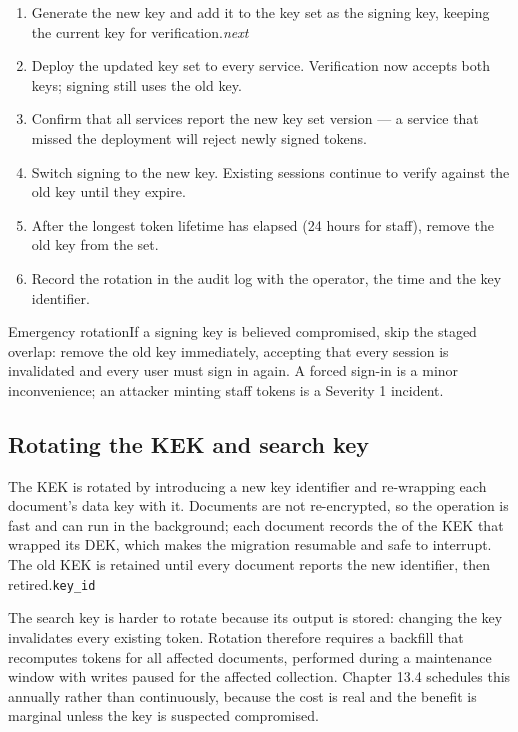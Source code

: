 \documentclass[11pt,a4paper,oneside]{book}
\begin{document}
\begin{enumerate}
\item Generate the new key and add it to the key set as the  signing key, keeping the current key for verification.\emph{next}
\item Deploy the updated key set to every service. Verification now accepts both keys; signing still uses the old key.
\item Confirm that all services report the new key set version — a service that missed the deployment will reject newly signed tokens.
\item Switch signing to the new key. Existing sessions continue to verify against the old key until they expire.
\item After the longest token lifetime has elapsed (24 hours for staff), remove the old key from the set.
\item Record the rotation in the audit log with the operator, the time and the key identifier.
\end{enumerate}
\begin{notebox}Emergency rotationIf a signing key is believed compromised, skip the staged overlap: remove the old key immediately, accepting that every session is invalidated and every user must sign in again. A forced sign-in is a minor inconvenience; an attacker minting staff tokens is a Severity 1 incident.\end{notebox}
\subsection*{Rotating the KEK and search key}
The KEK is rotated by introducing a new key identifier and re-wrapping each document's data key with it. Documents are not re-encrypted, so the operation is fast and can run in the background; each document records the  of the KEK that wrapped its DEK, which makes the migration resumable and safe to interrupt. The old KEK is retained until every document reports the new identifier, then retired.\texttt{key\_id}

The search key is harder to rotate because its output is stored: changing the key invalidates every existing token. Rotation therefore requires a backfill that recomputes tokens for all affected documents, performed during a maintenance window with writes paused for the affected collection. Chapter 13.4 schedules this annually rather than continuously, because the cost is real and the benefit is marginal unless the key is suspected compromised.
\end{document}
